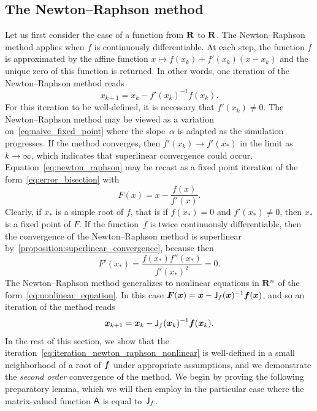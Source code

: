 \subsection{The Newton--Raphson method}
\label{sub:newton_raphson}
Let us first consider the case of a function from $\mathbf R$ to $\mathbf R$.
The Newton--Raphson method applies when $f$ is continuously differentiable.
At each step, the function $f$ is approximated by the affine function
$x \mapsto f(x_k) + f'(x_k) (x - x_k)$ and the unique zero of this function is returned.
In other words, one iteration of the Newton--Raphson method reads
\begin{equation}
    \label{eq:newton_raphson}
    x_{k+1} = x_k - f'(x_k)^{-1} f(x_k).
\end{equation}
For this iteration to be well-defined,
it is necessary that $f'(x_k) \neq 0$.
The Newton--Raphson method may be viewed as a variation on~\eqref{eq:naive_fixed_point} where the slope~$\alpha$ is adapted as the simulation progresses.
If the method converges, then $f'(x_k) \to f'(x_*)$ in the limit as $k \to \infty$,
which indicates that superlinear convergence could occur.
Equation~\eqref{eq:newton_raphson} may be recast as a fixed point iteration of the form~\eqref{eq:error_bisection} with
\[
    F(x) = x - \frac{f(x)}{f'(x)}.
\]
Clearly, if $x_*$ is a simple root of $f$, that is if $f(x_*) = 0$ and $f'(x_*) \neq 0$,
then $x_*$ is a fixed point of $F$.
If the function~$f$ is twice continuously differentiable,
then the convergence of the Newton--Raphson method is superlinear by~\cref{proposition:superlinear_convergence},
because then
\[
    F'(x_*) = \frac{f(x_*) f''(x_*)}{f'(x_*)^2} = 0.
\]
The Newton--Raphson method generalizes to nonlinear equations in $\mathbf R^n$ of the form~\eqref{eq:nonlinear_equation}.
In this case $\mathbf{\boldsymbol{F}}(\mathbf{\boldsymbol{x}}) = \mathbf{\boldsymbol{x}} - \mathsf J_f(\mathbf{\boldsymbol{x}})^{-1} \mathbf{\boldsymbol{f}}(\mathbf{\boldsymbol{x}})$,
and so an iteration of the method reads
\begin{equation}
    \label{eq:iteration_newton_raphson_nonlinear}
    \mathbf{\boldsymbol{x}}_{k+1} = \mathbf{\boldsymbol{x}}_k - \mathsf J_f(\mathbf{\boldsymbol{x}}_k)^{-1} \mathbf{\boldsymbol{f}}(\mathbf{\boldsymbol{x}}_k).
\end{equation}
In the rest of this section,
we show that the iteration~\eqref{eq:iteration_newton_raphson_nonlinear} is well-defined in a small neighborhood of a root of $\mathbf{\boldsymbol{f}}$ under appropriate assumptions,
and we demonstrate the \emph{second order} convergence of the method.
We begin by proving the following preparatory lemma,
which we will then employ in the particular case where the matrix-valued function $\mathsf A$ is equal to~$\mathsf J_f$.
